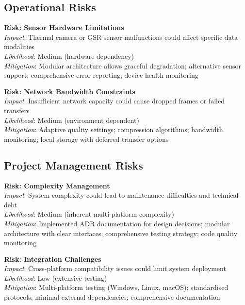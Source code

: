 \subsection{Operational Risks}
\textbf{Risk: Sensor Hardware Limitations}\\
\emph{Impact}: Thermal camera or GSR sensor malfunctions could affect specific data modalities\\
\emph{Likelihood}: Medium (hardware dependency)\\
\emph{Mitigation}: Modular architecture allows graceful degradation; alternative sensor support; comprehensive error reporting; device health monitoring

\textbf{Risk: Network Bandwidth Constraints}\\
\emph{Impact}: Insufficient network capacity could cause dropped frames or failed transfers\\
\emph{Likelihood}: Medium (environment dependent)\\
\emph{Mitigation}: Adaptive quality settings; compression algorithms; bandwidth monitoring; local storage with deferred transfer options

\subsection{Project Management Risks}
\textbf{Risk: Complexity Management}\\
\emph{Impact}: System complexity could lead to maintenance difficulties and technical debt\\
\emph{Likelihood}: Medium (inherent multi-platform complexity)\\
\emph{Mitigation}: Implemented ADR documentation for design decisions; modular architecture with clear interfaces; comprehensive testing strategy; code quality monitoring

\textbf{Risk: Integration Challenges}\\
\emph{Impact}: Cross-platform compatibility issues could limit system deployment\\
\emph{Likelihood}: Low (extensive testing)\\
\emph{Mitigation}: Multi-platform testing (Windows, Linux, macOS); standardised protocols; minimal external dependencies; comprehensive documentation

